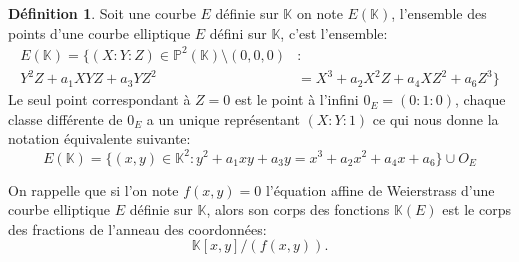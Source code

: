 \documentclass[10pt,a4paper]{book}
\theoremstyle{plain}
\theoremstyle{definition}
\theoremstyle{definition}
\theoremstyle{definition}
\theoremstyle{definition}
\theoremstyle{definition}
\newtheorem{defi}[thm]{Définition}
\theoremstyle{remark}
\theoremstyle{remark}
\theoremstyle{definition}
\begin{document}
\begin{defi}
Soit une courbe $E$ définie sur $\mathbb{K}$ on note $E(\mathbb{K})$, l'ensemble des points d'une courbe elliptique $E$ défini sur $\mathbb{K}$, c'est l'ensemble:
\begin{equation*}
\begin{alignedat}{1}
E(\mathbb{K})=\{(X:Y:Z)\in \mathbb{P}^2(\mathbb{K}) \setminus (0,0,0) &:  \\
Y^2Z+a_1XYZ+a_3YZ^2 &= X^3+a_2X^2Z+a_4XZ^2+a_6Z^3 \}
\end{alignedat}
\end{equation*}
Le seul point correspondant à $Z=0$ est le point à l'infini $0_E=(0:1:0)$, chaque classe différente de $0_E$ a un unique représentant $(X:Y:1)$ ce qui nous donne la notation équivalente suivante:
\begin{equation*}
E(\mathbb{K})=\{(x,y)\in \mathbb{K}^2  : y^2+a_1xy+a_3y=x^3+a_2x^2+a_4x+a_6 \} \cup {O_E}
\end{equation*}
\end{defi}

On rappelle que si l'on note $f(x,y)=0$ l'équation affine de Weierstrass d'une 
courbe elliptique $E$ définie sur $\mathbb{K}$, alors son corps des fonctions 
$\mathbb{K}(E)$ est le corps des fractions de l'anneau des coordonnées:
\begin{equation*}
\mathbb{K}[x,y]/(f(x,y)).
\end{equation*}
\end{document}
